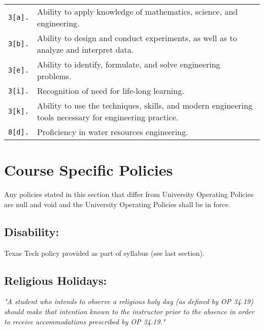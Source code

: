 \documentclass[12pt]{article}
\begin{document}
\begin{tabular}{p{0.5in}p{5.5in}}
\texttt{3[a].}  & Ability to apply knowledge of mathematics, science, and engineering.\\
\texttt{3[b].}  & Ability to design and conduct experiments, as well as to analyze and interpret data.\\
\texttt{3[e].}  & Ability to identify, formulate, and solve engineering problems.\\
\texttt{3[i].}   & Recognition of need for life-long learning.\\
\texttt{3[k].}  & Ability to use the techniques, skills, and modern engineering tools necessary for engineering practice.\\
\texttt{8[d].}  & Proficiency in water resources engineering.\\
\end{tabular}



\section*{Course Specific Policies}
Any  policies stated in this section that differ from University Operating Policies are null and void and the University Operating Policies shall be in force.
\subsection*{Disability:}
Texas Tech policy provided as part of syllabus (see last section).


\subsection*{Religious Holidays:}
\textsl{ "A student who intends to observe a religious holy day (as defined by OP 34.19) should
make that intention known to the instructor prior to the absence in order to receive accommodations
prescribed by OP 34.19."}
\end{document}
